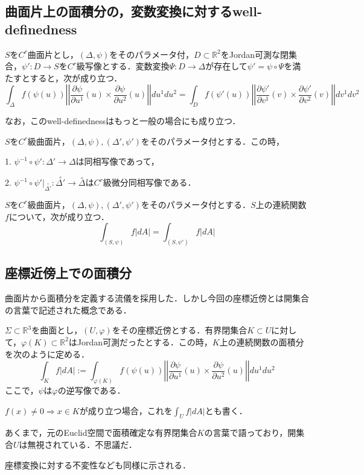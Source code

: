 \documentclass[uplatex, dvipdfmx]{jsreport}
\begin{document}
\subsection{曲面片上の面積分の，変数変換に対するwell-definedness}

\begin{lemma}\label{lemma-surface-integral-change-of-variable}
    $S$を$C^r$曲面片とし，$(\Delta,\psi)$をそのパラメータ付，$D\subset\mathbb{R}^2$をJordan可測な閉集合，$\psi':D\to S$を$C^r$級写像とする．変数変換$\Psi:D\to\Delta$が存在して$\psi'=\psi\circ\Psi$を満たすとすると，次が成り立つ．
    \[ \int_\Delta f(\psi(u))\left|\left| \frac{\partial \psi}{\partial u^1}(u)\times \frac{\partial \psi}{\partial u^2}(u) \right|\right|du^1du^2 = \int_D f(\psi'(u))\left|\left| \frac{\partial \psi'}{\partial v^1}(v)\times \frac{\partial \psi'}{\partial v^2}(v) \right|\right|dv^1dv^2 \]
\end{lemma}
\begin{remark}
    なお，このwell-definednessはもっと一般の場合にも成り立つ．
\end{remark}

\begin{lemma}
    $S$を$C^r$級曲面片，$(\Delta,\psi),(\Delta',\psi')$をそのパラメータ付とする．この時，
    
    1. $\psi^{-1}\circ\psi':\Delta'\to\Delta$は同相写像であって，
    
    2. $\psi^{-1}\circ\psi'|_{\overset{\circ}{\Delta'}}:\overset{\circ}{\Delta'}\to\overset{\circ}{\Delta}$は$C^r$級微分同相写像である．
\end{lemma}

\begin{corollary}
    $S$を$C^r$級曲面片，$(\Delta,\psi),(\Delta',\psi')$をそのパラメータ付とする．$S$上の連続関数$f$について，次が成り立つ．
    \[ \int_{(S,\psi)} f|dA| = \int_{(S,\psi')}f|dA| \]
\end{corollary}


\subsection{座標近傍上での面積分}
曲面片から面積分を定義する流儀を採用した．しかし今回の座標近傍とは開集合の言葉で記述された概念である．

\begin{definition}
    $\Sigma\subset\mathbb{R}^3$を曲面とし，$(U,\varphi)$をその座標近傍とする．有界閉集合$K\subset U$に対して，$\varphi(K)\subset\mathbb{R}^2$はJordan可測だったとする．この時，$K$上の連続関数の面積分を次のように定める．
    \[ \int_Kf|dA| := \int_{\varphi(K)}f(\psi(u)) \left|\left| \frac{\partial \psi}{\partial u^1}(u)\times \frac{\partial \psi}{\partial u^2}(u) \right|\right|du^1du^2 \]
    ここで，$\psi$は$\varphi$の逆写像である．

    $f(x)\ne 0\Rightarrow x\in K$が成り立つ場合，これを$\int_Uf|dA|$とも書く．
\end{definition}
\begin{remark*}
    あくまで，元のEuclid空間で面積確定な有界閉集合$K$の言葉で語っており，開集合$U$は無視されている．不思議だ．

    座標変換に対する不変性なども同様に示される．
\end{remark*}
\end{document}
